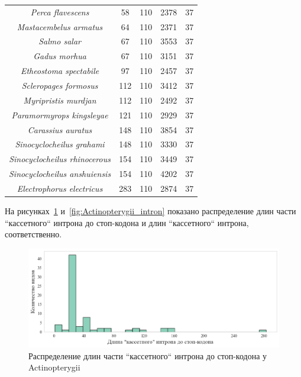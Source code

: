 \begin{longtable}[c]{|c|c|c|c|c|}
\textit{Perca flavescens}              & 58  & 110 & 2378 & 37 \\
\textit{Mastacembelus armatus}         & 64  & 110 & 2371 & 37 \\
\textit{Salmo salar}                   & 67  & 110 & 3553 & 37 \\
\textit{Gadus morhua}                  & 67  & 110 & 3151 & 37 \\
\textit{Etheostoma spectabile}         & 97  & 110 & 2457 & 37 \\
\textit{Scleropages formosus}          & 112 & 110 & 3412 & 37 \\
\textit{Myripristis murdjan}           & 112 & 110 & 2492 & 37 \\
\textit{Paramormyrops kingsleyae}      & 121 & 110 & 2929 & 37 \\
\textit{Carassius auratus}             & 148 & 110 & 3854 & 37 \\
\textit{Sinocyclocheilus grahami}      & 148 & 110 & 3330 & 37 \\
\textit{Sinocyclocheilus rhinocerous}  & 154 & 110 & 3449 & 37 \\
\textit{Sinocyclocheilus anshuiensis}  & 154 & 110 & 4202 & 37 \\
\textit{Electrophorus electricus}      & 283 & 110 & 2874 & 37 \\ \hline
\end{longtable}


На рисунках~\ref{fig:Actinopterygii_intron_stop} и~\ref{fig:Actinopterygii_intron} показано распределение длин части ``кассетного`` интрона до стоп-кодона и длин ``кассетного`` интрона, соответственно.

\begin{figure}[h] %
    \centering
    \includegraphics[width=1.0\textwidth]{images/Actinopterygii_intron_stop}
    \caption{Распределение длин части ``кассетного`` интрона до стоп-кодона у Actinopterygii}
    \label{fig:Actinopterygii_intron_stop}
\end{figure}

